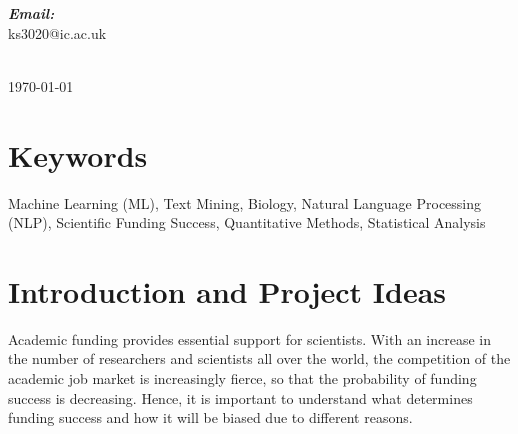 \documentclass[11pt]{article}
\begin{document}
\begin{titlepage}
\begin{minipage}{0.5\textwidth}
\begin{flushright}
      \emph{\textbf{Email:}} \\
      ks3020@ic.ac.uk
      \end{flushright}
    \end{minipage}\\[1cm]

    \vspace*{0.5cm}
    \today \\ %



    \vfill %

    \end{titlepage}


\pagestyle{fancy}
\fancyhf{}

\linenumbers

\section*{Keywords}
Machine Learning (ML), Text Mining, Biology, Natural Language Processing (NLP), Scientific Funding Success, Quantitative Methods, Statistical Analysis


\section{Introduction and Project Ideas}

Academic funding provides essential support for scientists. With an increase in the number of researchers and scientists all over the world, the competition of the academic job market is increasingly fierce, so that the probability of funding success is decreasing. Hence, it is important to understand what determines funding success and how it will be biased due to different reasons.
\end{document}
